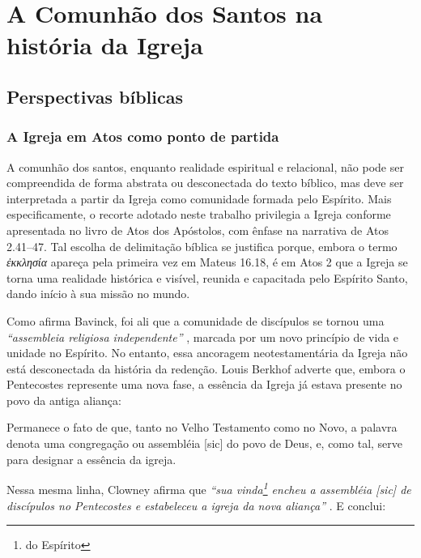 \chapter{A Comunhão dos Santos na história da Igreja}

\section{Perspectivas bíblicas}

\subsection{A Igreja em Atos como ponto de partida}

A comunhão dos santos, enquanto realidade espiritual e relacional, não pode ser compreendida de forma abstrata ou desconectada do texto bíblico, mas deve ser interpretada a partir da Igreja como comunidade formada pelo Espírito. Mais especificamente, o recorte adotado neste trabalho privilegia a Igreja conforme apresentada no livro de Atos dos Apóstolos, com ênfase na narrativa de Atos 2.41–47. Tal escolha de delimitação bíblica se justifica porque, embora o termo \textit{\foreignlanguage{greek}{ἐκκλησία}} apareça pela primeira vez em Mateus 16.18, é em Atos 2 que a Igreja se torna uma realidade histórica e visível, reunida e capacitada pelo Espírito Santo, dando início à sua missão no mundo.

Como afirma Bavinck, foi ali que a comunidade de discípulos se tornou uma \textit{``assembleia religiosa independente''} \cite[p.~284]{bavinck2012}, marcada por um novo princípio de vida e unidade no Espírito. No entanto, essa ancoragem neotestamentária da Igreja não está desconectada da história da redenção. Louis Berkhof adverte que, embora o Pentecostes represente uma nova fase, a essência da Igreja já estava presente no povo da antiga aliança:

\begin{citacao}
    Permanece o fato de que, tanto no Velho Testamento como no Novo, a palavra denota uma congregação ou assembléia [sic] do povo de Deus, e, como tal, serve para designar a essência da igreja. \cite[p.~650]{berkhof2012}
\end{citacao}

Nessa mesma linha, Clowney afirma que \textit{``sua vinda\footnote{do Espírito} encheu a assembléia [sic] de discípulos no Pentecostes e estabeleceu a igreja da nova aliança''} \cite[p.~24]{clowney2007}. E conclui:

